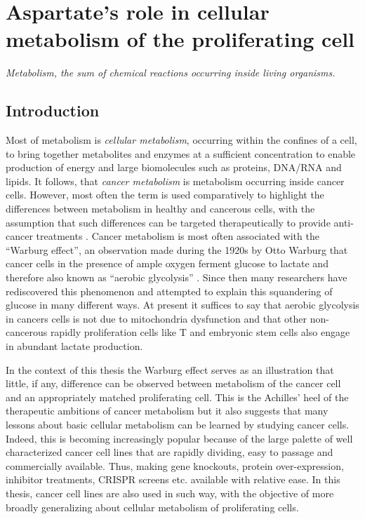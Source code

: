 \chapter{Aspartate's role in cellular metabolism of the proliferating cell}
\label{chap1}
\textit{Metabolism, the sum of chemical reactions occurring inside living organisms.}

\section{Introduction}
Most of metabolism is \textit{cellular metabolism}, occurring within the confines of a cell, to bring together metabolites and enzymes at a sufficient concentration to enable production of energy and large biomolecules such as proteins, DNA/RNA and lipids.
It follows, that \textit{cancer metabolism} is metabolism occurring inside cancer cells.
However, most often the term is used comparatively to highlight the differences between metabolism in healthy and cancerous cells, with the assumption that such differences can be targeted therapeutically to provide anti-cancer treatments \cite{Vander_Heiden2011-ce, Hamanaka2012-kw, Luengo2017-kf, Vasan2020-yr}.
Cancer metabolism is most often associated with the ``Warburg effect'', an observation made during the 1920s by Otto Warburg that cancer cells in the presence of ample oxygen ferment glucose to lactate and therefore also known as ``aerobic glycolysis'' \cite{warburg1926stoffwechsel, Chandel2021-rf}.
Since then many researchers have rediscovered this phenomenon and attempted to explain this squandering of glucose in many different ways.
At present it suffices to say that aerobic glycolysis in cancers cells is not due to mitochondria dysfunction and that other non-cancerous rapidly proliferation cells like T and embryonic stem cells also engage in abundant lactate production.

In the context of this thesis the Warburg effect serves as an illustration that little, if any, difference can be observed between metabolism of the cancer cell and an appropriately matched proliferating cell.
This is the Achilles' heel of the therapeutic ambitions of cancer metabolism but it also suggests that many lessons about basic cellular metabolism can be learned by studying cancer cells.
Indeed, this is becoming increasingly popular because of the large palette of well characterized cancer cell lines that are rapidly dividing, easy to passage and commercially available.
Thus, making gene knockouts, protein over-expression, inhibitor treatments, CRISPR screens etc. available with relative ease.
In this thesis, cancer cell lines are also used in such way, with the objective of more broadly generalizing about cellular metabolism of proliferating cells.



